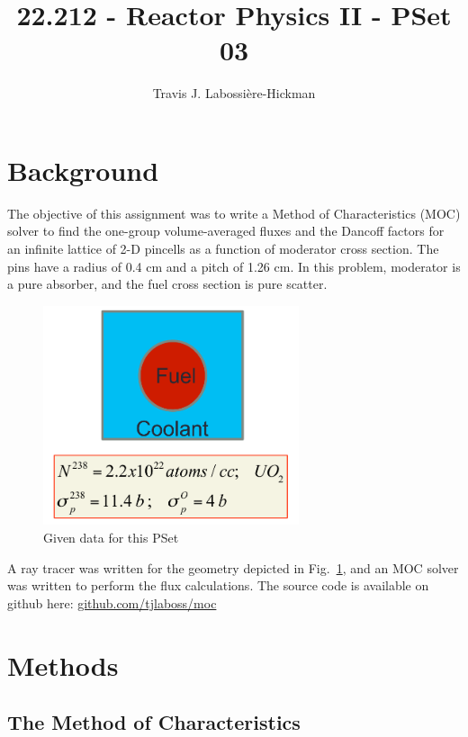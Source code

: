 \documentclass[12pt]{article}
\begin{document}
\title{22.212 - Reactor Physics II - PSet 03} 
\author{Travis J. Labossi\`{e}re-Hickman} 
\date{}
\maketitle 

\section{Background}\label{sec:background}

The objective of this assignment was to write a Method of Characteristics (MOC) solver to find the one-group volume-averaged fluxes and the Dancoff factors for an infinite lattice of 2-D pincells as a function of moderator cross section. The pins have a radius of 0.4 cm and a pitch of 1.26 cm. In this problem, moderator is a pure absorber, and the fuel cross section is pure scatter.


\begin{figure}[h]
\centering
\includegraphics[width=0.67\textwidth]{figs/given.jpg}
\caption{Given data for this PSet}
\label{fig:given}
\end{figure}

A ray tracer was written for the geometry depicted in Fig.~\ref{fig:given}, and an MOC solver was written to perform the flux calculations. The source code is available on github here: \href{https://github.com/tjlaboss/moc}{github.com/tjlaboss/moc}

\newpage

\section{Methods}\label{sec:methods}

\subsection{The Method of Characteristics}\label{sec:moc}
\end{document}
